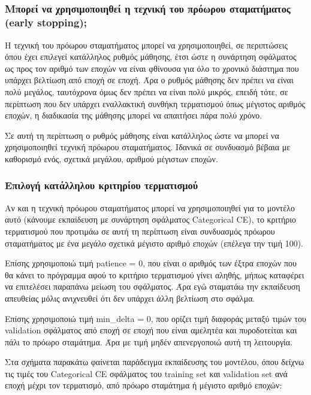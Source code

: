 \documentclass[12pt,a4paper]{article}
\begin{document}
\subsection{}

\subsubsection{Μπορεί να χρησιμοποιηθεί η τεχνική του πρόωρου σταματήματος (early stopping);}
Η τεχνική του πρόωρου σταματήματος μπορεί να χρησιμοποιηθεί, σε περιπτώσεις όπου έχει επιλεγεί κατάλληλος ρυθμός μάθησης, έτσι ώστε η συνάρτηση σφάλματος ως προς τον αριθμό των εποχών να είναι φθίνουσα για όλο το χρονικό διάστημα που υπάρχει βελτίωση από εποχή σε εποχή. Άρα ο ρυθμός μάθησης δεν πρέπει να είναι πολύ μεγάλος, ταυτόχρονα όμως δεν πρέπει να είναι πολύ μικρός, επειδή τότε, σε περίπτωση που δεν υπάρχει εναλλακτική συνθήκη τερματισμού όπως μέγιστος αριθμός εποχών, η διαδικασία της μάθησης μπορεί να απαιτήσει πάρα πολύ χρόνο.

Σε αυτή τη περίπτωση ο ρυθμός μάθησης είναι κατάλληλος ώστε να μπορεί να χρησιμοποιηθεί τεχνική πρόωρου σταματήματος. Ιδανικά σε συνδυασμό βέβαια με καθορισμό ενός, σχετικά μεγάλου, αριθμού μέγιστων εποχών.

\subsubsection{Επιλογή κατάλληλου κριτηρίου τερματισμού}
Αν και η τεχνική πρόωρου σταματήματος μπορεί να χρησιμοποιηθεί για το μοντέλο αυτό (κάνουμε εκπαίδευση με συνάρτηση σφάλματος Categorical CE), το κριτήριο τερματισμού που προτιμάω σε αυτή τη περίπτωση είναι συνδυασμός πρόωρου σταματήματος με ένα μεγάλο σχετικά μέγιστο αριθμό εποχών (επέλεγα την τιμή 100).

Επίσης χρησιμοποιώ τιμή patience = 0, που είναι ο αριθμός των έξτρα εποχών που θα κάνει το πρόγραμμα αφού το κριτήριο τερματισμού γίνει αληθής, μήπως καταφέρει να επιτελέσει παραπάνω μείωση του σφάλματος. Άρα εγώ σταματάω την εκπαίδευση απευθείας μόλις ανιχνευθεί ότι δεν υπάρχει άλλη βελτίωση στο σφάλμα.

Επίσης χρησιμοποιώ τιμή min\_delta = 0, που ορίζει τιμή διαφοράς μεταξύ τιμών του validation σφάλματος από εποχή σε εποχή που είναι αμελητέα και πυροδοτείται και πάλι το πρόωρο σταμάτημα. Άρα με τιμή μηδέν απενεργοποιώ αυτή τη λειτουργία.

Στα σχήματα παρακάτω φαίνεται παράδειγμα εκπαίδευσης του μοντέλου, όπου δείχνω τις τιμές του Categorical CE σφάλματος του training set και validation set ανά εποχή μέχρι τον τερματισμό, από πρόωρο σταμάτημα ή μέγιστο αριθμό εποχών:
\end{document}
